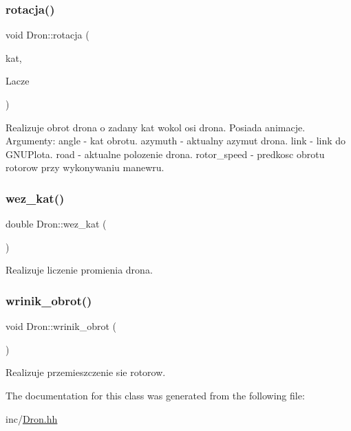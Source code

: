 \subsubsection{\texorpdfstring{rotacja()}{rotacja()}}
{\footnotesize\ttfamily void Dron\+::rotacja (\begin{DoxyParamCaption}\item[{const double \&}]{kat,  }\item[{\mbox{\hyperlink{class_pz_g_1_1_lacze_do_g_n_u_plota}{Pz\+G\+::\+Lacze\+Do\+G\+N\+U\+Plota}}}]{Lacze }\end{DoxyParamCaption})\hspace{0.3cm}{\ttfamily [inline]}}

Realizuje obrot drona o zadany kat wokol osi drona. Posiada animacje. Argumenty\+: angle -\/ kat obrotu. azymuth -\/ aktualny azymut drona. link -\/ link do G\+N\+U\+Plota. road -\/ aktualne polozenie drona. rotor\+\_\+speed -\/ predkosc obrotu rotorow przy wykonywaniu manewru. \mbox{\label{class_dron_a0e17db391f41adf89bd72e6b78e35d39}} 
\subsubsection{\texorpdfstring{wez\_kat()}{wez\_kat()}}
{\footnotesize\ttfamily double Dron\+::wez\+\_\+kat (\begin{DoxyParamCaption}{ }\end{DoxyParamCaption})\hspace{0.3cm}{\ttfamily [inline]}}

Realizuje liczenie promienia drona. \mbox{\label{class_dron_ae393be8215912f95339b3bb0c586c8cf}} 
\subsubsection{\texorpdfstring{wrinik\_obrot()}{wrinik\_obrot()}}
{\footnotesize\ttfamily void Dron\+::wrinik\+\_\+obrot (\begin{DoxyParamCaption}{ }\end{DoxyParamCaption})\hspace{0.3cm}{\ttfamily [inline]}}

Realizuje przemieszczenie sie rotorow. 

The documentation for this class was generated from the following file\+:\begin{DoxyCompactItemize}
\item 
inc/\mbox{\hyperlink{_dron_8hh}{Dron.\+hh}}\end{DoxyCompactItemize}
